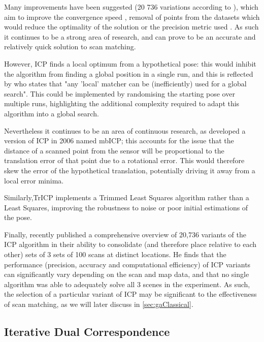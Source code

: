 \documentclass[authoryearcitations]{UoYCSproject}
\begin{document}
Many improvements have been suggested (20 736 variations according to \citet{Donoso2017-wp}), which aim to improve the convergence speed \cite{Donoso2017-wp} \cite{Simon1996-dl}, removal of points from the datasets which would reduce the optimality of the solution \cite{Weik1997-px} \cite{Masuda1996-av} or the precision metric used \cite{Eggert1997-ak}. As such it continues to be a strong area of research, and can prove to be an accurate and relatively quick solution to scan matching.

However, ICP finds a local optimum from a hypothetical pose: this would inhibit the algorithm from finding a global position in a single run, and this is reflected by \citet{Censi2005-iv} who states that "any 'local' matcher can be (inefficiently) used for a global search". This could be implemented by randomising the starting pose over multiple runs, highlighting the additional complexity required to adapt this algorithm into a global search.

Nevertheless it continues to be an area of continuous research, as \citet{Minguez2006-nj} developed a version of ICP in 2006 named mbICP;  this accounts for the issue that the distance of a scanned point from the sensor will be proportional to the translation error of that point due to a rotational error. This would therefore skew the error of the hypothetical translation, potentially driving it away from a local error minima.

Similarly,TrICP \cite{Chetverikov2005-yz} implements a Trimmed Least Squares \cite{Ruppert1980-js} algorithm rather than a Least Squares, improving the robustness to noise or poor initial estimations of the pose.

Finally, \citet{Donoso2017-wp} recently published a comprehensive  overview of 20,736 variants of the ICP algorithm in their ability to consolidate (and therefore place relative to each other) sets of 3 sets of 100 scans at distinct locations. He finds that the performance (precision, accuracy and computational efficiency) of ICP variants can significantly vary depending on the scan and map data, and that no single algorithm was able to adequately solve all 3 scenes in the experiment. As such, the selection of a particular variant of ICP may be significant to the effectiveness of scan matching, as we will later discuss in \ref{sec:gaClassical}.


\subsection{Iterative Dual Correspondence}
\end{document}
